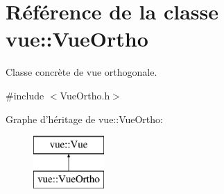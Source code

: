 \hypertarget{classvue_1_1_vue_ortho}{\section{Référence de la classe vue\-:\-:Vue\-Ortho}
\label{classvue_1_1_vue_ortho}
}


Classe concrète de vue orthogonale.  




{\ttfamily \#include $<$Vue\-Ortho.\-h$>$}

Graphe d'héritage de vue\-:\-:Vue\-Ortho\-:\begin{figure}[H]
\begin{center}
\leavevmode
\includegraphics[height=2.000000cm]{classvue_1_1_vue_ortho}
\end{center}
\end{figure}
